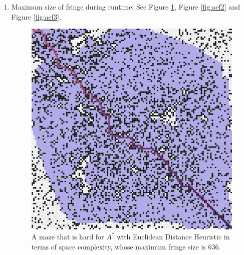 \documentclass[letter]{article}
\begin{document}
\begin{enumerate}[resume]
\begin{enumerate}
\begin{enumerate}
				
				\item {Maximum size of fringe during runtime: See Figure \ref{fig:aef1}, Figure \ref{fig:aef2} and Figure \ref{fig:aef3}.} \\
				\begin{figure}
					\minipage{\textwidth}
					
					\includegraphics[width=\textwidth]{../pics/aef/636.png}
					\caption{\label{fig:aef1}A maze that is hard for $ A^* $ with Euclidean Distance Heuristic in terms of space complexity, whose maximum fringe size is 636. }
					

\end{figure}
\end{enumerate}
\end{enumerate}
\end{enumerate}
\end{document}
